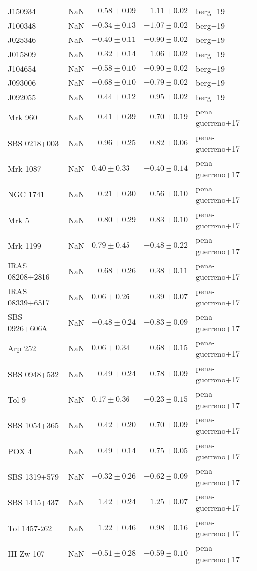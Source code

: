 \documentclass[11pt]{article}
\begin{document}
\begin{longtable}{lllll}
J150934 & NaN & $-0.58 \pm 0.09$ & $-1.11 \pm 0.02$ & berg+19 \\
J100348 & NaN & $-0.34 \pm 0.13$ & $-1.07 \pm 0.02$ & berg+19 \\
J025346 & NaN & $-0.40 \pm 0.11$ & $-0.90 \pm 0.02$ & berg+19 \\
J015809 & NaN & $-0.32 \pm 0.14$ & $-1.06 \pm 0.02$ & berg+19 \\
J104654 & NaN & $-0.58 \pm 0.10$ & $-0.90 \pm 0.02$ & berg+19 \\
J093006 & NaN & $-0.68 \pm 0.10$ & $-0.79 \pm 0.02$ & berg+19 \\
J092055 & NaN & $-0.44 \pm 0.12$ & $-0.95 \pm 0.02$ & berg+19 \\
Mrk 960 & NaN & $-0.41 \pm 0.39$ & $-0.70 \pm 0.19$ & pena-guerreno+17 \\
SBS 0218+003 & NaN & $-0.96 \pm 0.25$ & $-0.82 \pm 0.06$ & pena-guerreno+17 \\
Mrk 1087 & NaN & $0.40 \pm 0.33$ & $-0.40 \pm 0.14$ & pena-guerreno+17 \\
NGC 1741 & NaN & $-0.21 \pm 0.30$ & $-0.56 \pm 0.10$ & pena-guerreno+17 \\
Mrk 5 & NaN & $-0.80 \pm 0.29$ & $-0.83 \pm 0.10$ & pena-guerreno+17 \\
Mrk 1199 & NaN & $0.79 \pm 0.45$ & $-0.48 \pm 0.22$ & pena-guerreno+17 \\
IRAS 08208+2816 & NaN & $-0.68 \pm 0.26$ & $-0.38 \pm 0.11$ & pena-guerreno+17 \\
IRAS 08339+6517 & NaN & $0.06 \pm 0.26$ & $-0.39 \pm 0.07$ & pena-guerreno+17 \\
SBS 0926+606A & NaN & $-0.48 \pm 0.24$ & $-0.83 \pm 0.09$ & pena-guerreno+17 \\
Arp 252 & NaN & $0.06 \pm 0.34$ & $-0.68 \pm 0.15$ & pena-guerreno+17 \\
SBS 0948+532 & NaN & $-0.49 \pm 0.24$ & $-0.78 \pm 0.09$ & pena-guerreno+17 \\
Tol 9 & NaN & $0.17 \pm 0.36$ & $-0.23 \pm 0.15$ & pena-guerreno+17 \\
SBS 1054+365 & NaN & $-0.42 \pm 0.20$ & $-0.70 \pm 0.09$ & pena-guerreno+17 \\
POX 4 & NaN & $-0.49 \pm 0.14$ & $-0.75 \pm 0.05$ & pena-guerreno+17 \\
SBS 1319+579 & NaN & $-0.32 \pm 0.26$ & $-0.62 \pm 0.09$ & pena-guerreno+17 \\
SBS 1415+437 & NaN & $-1.42 \pm 0.24$ & $-1.25 \pm 0.07$ & pena-guerreno+17 \\
Tol 1457-262 & NaN & $-1.22 \pm 0.46$ & $-0.98 \pm 0.16$ & pena-guerreno+17 \\
III Zw 107 & NaN & $-0.51 \pm 0.28$ & $-0.59 \pm 0.10$ & pena-guerreno+17 \\
\hline
\end{longtable}
\end{document}
